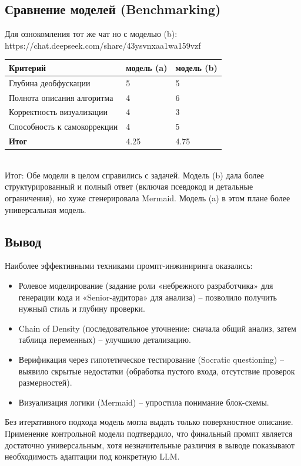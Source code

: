 \subsection{Сравнение моделей (Benchmarking)}
Для ознокомления тот же чат но с моделью (b): \\
https://chat.deepseek.com/share/43ysvnxaa1wa159vzf
\begin{table}[h!]
	\centering
	\begin{tabular}{|l|p{5cm}|p{5cm}|}
		\hline
		\textbf{Критерий} & \textbf{модель (a)} & \textbf{модель (b)} \\
		\hline
		Глубина деобфускации & 5 & 5 \\
		\hline
		Полнота описания алгоритма & 4 & 6 \\
		\hline
		Корректность визуализации & 4 & 3 \\
		\hline
		Способность к самокоррекции & 4 & 5 \\
		\hline
		\textbf{Итог} & 4.25 & 4.75\\
		\hline
	\end{tabular}
\end{table} \\
Итог: Обе модели в целом справились с задачей. Модель (b) дала более структурированный и полный ответ (включая псевдокод и детальные ограничения), но хуже сгенерировала Mermaid. Модель (a) в этом плане более универсальная модель.
\newpage
\subsection{Вывод}
\noindent
Наиболее эффективными техниками промпт-инжиниринга оказались:
\begin{itemize}
	\item Ролевое моделирование (задание роли «небрежного разработчика» для генерации кода и «Senior-аудитора» для анализа) – позволило получить нужный стиль и глубину проверки.
	\item Chain of Density (последовательное уточнение: сначала общий анализ, затем таблица переменных) – улучшило детализацию.
	\item Верификация через гипотетическое тестирование (Socratic questioning) – выявило скрытые недостатки (обработка пустого входа, отсутствие проверок размерностей).
	\item Визуализация логики (Mermaid) – упростила понимание блок-схемы.
\end{itemize}
Без итеративного подхода модель могла выдать только поверхностное описание. Применение контрольной модели подтвердило, что финальный промпт является достаточно универсальным, хотя незначительные различия в выводе показывают необходимость адаптации под конкретную LLM.
